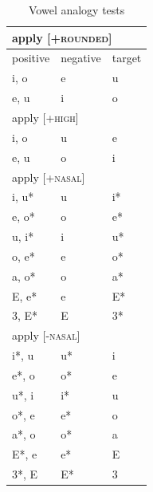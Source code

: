 \documentclass[11pt]{article}
\begin{document}
\newpage
\begin{table}[h]
\centering

\caption{Vowel analogy tests}
\begin{tabular}{ l | l | l }
\hline \multicolumn{3}{l}{apply \textsc{[+rounded]}}\\  \hline
positive & negative & target \\\hline
i, o & e & u \\
e, u & i & o \\
\hline \multicolumn{3}{l}{apply \textsc{[+high]}}\\  \hline
i, o & u & e \\
e, u & o & i \\
\hline \multicolumn{3}{l}{apply \textsc{[+nasal]}}\\  \hline
i, u* & u & i* \\
e, o* & o & e* \\
u, i* & i & u* \\
o, e* & e & o* \\
a, o* & o & a* \\
E, e* & e & E* \\
3, E* & E & 3* \\
\hline \multicolumn{3}{l}{apply \textsc{[-nasal]}}\\  \hline
i*, u & u* & i \\
e*, o & o* & e \\
u*, i & i* & u \\
o*, e & e* & o \\
a*, o & o* & a \\
E*, e & e* & E \\
3*, E & E* & 3 \\
\end{tabular}
\end{table}
\end{document}
